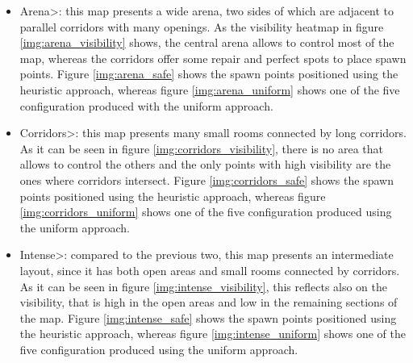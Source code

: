 \begin{itemize}
\item \<Arena>: this map presents a wide arena, two sides of which are adjacent to parallel corridors with many openings. As the visibility heatmap in figure \ref{img:arena_visibility} shows, the central arena allows to control most of the map, whereas the corridors offer some repair and perfect spots to place spawn points. Figure \ref{img:arena_safe} shows the spawn points positioned using the heuristic approach, whereas figure \ref{img:arena_uniform} shows one of the five configuration produced with the uniform approach.
\item \<Corridors>: this map presents many small rooms connected by long corridors. As it can be seen in figure \ref{img:corridors_visibility}, there is no area that allows to control the others and the only points with high visibility are the ones where corridors intersect. Figure \ref{img:corridors_safe} shows the spawn points positioned using the heuristic approach, whereas figure \ref{img:corridors_uniform} shows one of the five configuration produced using the uniform approach.
\item \<Intense>: compared to the previous two, this map presents an intermediate layout, since it has both open areas and small rooms connected by corridors. As it can be seen in figure \ref{img:intense_visibility}, this reflects also on the visibility, that is high in the open areas and low in the remaining sections of the map. Figure \ref{img:intense_safe} shows the spawn points positioned using the heuristic approach, whereas figure \ref{img:intense_uniform} shows one of the five configuration produced using the uniform approach.
\end{itemize}

